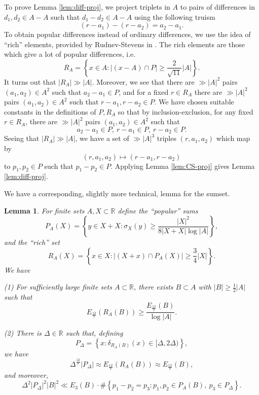 \documentclass[reqno]{amsart}
\numberwithin{equation}{section}
\newtheorem{lemma}[theorem]{Lemma}
\begin{document}
To prove Lemma \ref{lem:diff-proj}, we project triplets in \(A\) to pairs of differences in \(d_1,d_2 \in A-A\)
such that \(d_1- d_2 \in A-A\) using the following truism
\[
    (r - a_1) - (r - a_2) = a_2 - a_1
.\]
To obtain popular differences instead of ordinary differences, we use the idea of ``rich'' elements, provided by
Rudnev-Stevens in \cite{rudnev-stevens}. The rich elements are those which give a lot of popular differences, i.e.
\[
    R_{A} = \left\{ x \in A : \left\lvert (x - A)\cap P \right\rvert \geq \frac{2}{\sqrt{11} } \left\lvert A \right\rvert  \right\} 
.\]
It turns out that \(\left\lvert R_{A}  \right\rvert \gg \left\lvert A \right\rvert \). Moreover, we see that there are \(\gg \left\lvert A \right\rvert ^{2}\) pairs
\((a_1,a_2)\in A^{2}\) such that \(a_2 - a_1 \in P\), and for a fixed \(r \in R_{A} \) there are \(\gg \left\lvert A \right\rvert ^{2}\) pairs \((a_1,a_2) \in A^{2}\)
such that \(r-a_1,r-a_2 \in P\). We have chosen suitable constants in the definitions of \(P,R_{A} \)
so that by inclusion-exclusion, for any fixed \(r \in R_{A} \), there are \(\gg \left\lvert A \right\rvert ^{2}\) pairs \((a_1,a_2)\in A^{2}\)
such that
\[
    a_2-a_1 \in P,~ r-a_1 \in P,~ r-a_2 \in P
.\]
Seeing that \(\left\lvert R_{A}  \right\rvert \gg \left\lvert A \right\rvert \), we have a set of \(\gg \left\lvert A \right\rvert ^{3} \)
triples \((r,a_1,a_2)\) which map by
\[
    (r,a_1,a_2) \mapsto (r-a_1,r-a_2)
\]
to \(p_1,p_2 \in P\) such that \(p_1-p_2 \in P\). Applying Lemma \ref{lem:CS-proj} gives
Lemma \ref{lem:diff-proj}.

\medskip

We have a corresponding, slightly more technical, lemma for the sumset.
\begin{lemma}\label{lem:sum-proj}
For finite sets \(A,X \subset \mathbb{R} \) define the ``popular'' sums
\[
    P_{A} (X) = \left\{ y \in X + X : \sigma_{X} (y) \geq \frac{\left\lvert X \right\rvert ^{2}}{8  \left\lvert X+X \right\rvert \log \left\lvert A \right\rvert }  \right\} 
,\]
and the ``rich'' set
\[
    R_{A} (X) = \left\{ x \in X : \left\lvert \left( X + x \right) \cap P_{A} (X) \right\rvert \geq \frac{3}{4}  \left\lvert X \right\rvert  \right\} 
.\]
We have

(1)
For sufficiently large finite sets \(A \subset \mathbb{R} \), there exists \(B \subset A\) with \(\left\lvert B \right\rvert \geq \frac{1}{2} \left\lvert A \right\rvert \) such that
\[
    E_{\frac{12}{7} } (R_{A} (B)) \geq \frac{E_{\frac{12}{7} } (B)}{\log \left\lvert A \right\rvert } 
.\]

(2)
There is \(\Delta \in \mathbb{R} \) such that, defining
\[
    P_{\Delta} = \left\{ x : \delta_{R_{A} (B)} (x) \in [\Delta,2\Delta) \right\} 
,\]
we have
\[
    \Delta^{\frac{12}{7} } \left\lvert P_{\Delta}  \right\rvert \approx E_{\frac{12}{7} } (R_{A} (B))\approx E_{\frac{12}{7} } (B)
,\]
and moreover,
\begin{equation} \label{eq:sum-proj-eq}
    \Delta^{2} \left\lvert P_{\Delta}  \right\rvert ^{2} \left\lvert B \right\rvert ^{2} \ll E_3(B) \cdot \# \left\{ p_1 - p_2 = p_3 : p_1,p_2 \in P_{A} (B),~ p_3 \in P_{\Delta}  \right\}.
\end{equation}  
\end{lemma}
\end{document}
